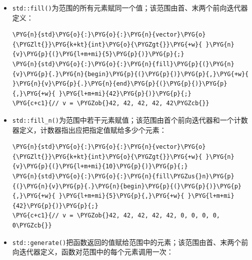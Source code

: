 \begin{itemize}
\item \texttt{std::\allowbreak{}fill()}为范围的所有元素赋同一个值；该范围由首、末两个前向迭代器定义：



\begin{codeblockbg}
\begin{Verbatim}[commandchars=\\\{\},breaklines=true,breakanywhere=true,fontsize=\codefont,xleftmargin=17bp]
\PYG{n}{std}\PYG{o}{:}\PYG{o}{:}\PYG{n}{vector}\PYG{o}{\PYGZlt{}}\PYG{k+kt}{int}\PYG{o}{\PYGZgt{}}\PYG{+w}{ }\PYG{n}{v}\PYG{p}{(}\PYG{l+m+mi}{5}\PYG{p}{)}\PYG{p}{;}
\PYG{n}{std}\PYG{o}{:}\PYG{o}{:}\PYG{n}{fill}\PYG{p}{(}\PYG{n}{v}\PYG{p}{.}\PYG{n}{begin}\PYG{p}{(}\PYG{p}{)}\PYG{p}{,}\PYG{+w}{ }\PYG{n}{v}\PYG{p}{.}\PYG{n}{end}\PYG{p}{(}\PYG{p}{)}\PYG{p}{,}\PYG{+w}{ }\PYG{l+m+mi}{42}\PYG{p}{)}\PYG{p}{;}
\PYG{c+c1}{// v = \PYGZob{}42, 42, 42, 42, 42\PYGZcb{}}
\end{Verbatim}
\end{codeblockbg}



\item \texttt{std::\allowbreak{}fill\_\allowbreak{}n()}为范围中若干元素赋值；该范围由首个前向迭代器和一个计数器定义，计数器指出应把指定值赋给多少个元素：



\begin{codeblockbg}
\begin{Verbatim}[commandchars=\\\{\},breaklines=true,breakanywhere=true,fontsize=\codefont,xleftmargin=17bp]
\PYG{n}{std}\PYG{o}{:}\PYG{o}{:}\PYG{n}{vector}\PYG{o}{\PYGZlt{}}\PYG{k+kt}{int}\PYG{o}{\PYGZgt{}}\PYG{+w}{ }\PYG{n}{v}\PYG{p}{(}\PYG{l+m+mi}{10}\PYG{p}{)}\PYG{p}{;}
\PYG{n}{std}\PYG{o}{:}\PYG{o}{:}\PYG{n}{fill\PYGZus{}n}\PYG{p}{(}\PYG{n}{v}\PYG{p}{.}\PYG{n}{begin}\PYG{p}{(}\PYG{p}{)}\PYG{p}{,}\PYG{+w}{ }\PYG{l+m+mi}{5}\PYG{p}{,}\PYG{+w}{ }\PYG{l+m+mi}{42}\PYG{p}{)}\PYG{p}{;}
\PYG{c+c1}{// v = \PYGZob{}42, 42, 42, 42, 42, 0, 0, 0, 0, 0\PYGZcb{}}
\end{Verbatim}
\end{codeblockbg}



\item \texttt{std::\allowbreak{}generate()}把函数返回的值赋给范围中的元素；该范围由首、末两个前向迭代器定义，函数对范围中的每个元素调用一次：



\end{itemize}
